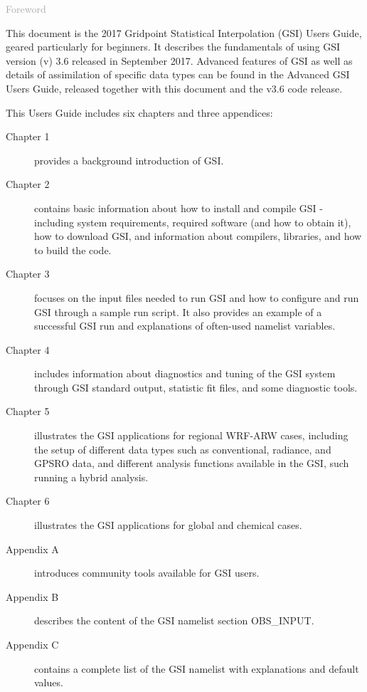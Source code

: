 \begin{titlepage}
\vspace*{0.5cm}
\noindent

\begin{flushleft}
\textcolor{darkgray}{\LARGE Foreword}
\vspace*{1cm}\par

This document is the 2017 Gridpoint Statistical Interpolation (GSI) User\textquotesingle s Guide, geared particularly for beginners. It describes the fundamentals of using GSI version (v) 3.6 released in September 2017. Advanced features of GSI as well as details of assimilation of specific data types can be found in the Advanced GSI User\textquotesingle s Guide, released together with this document and the v3.6 code release.

This User\textquotesingle s Guide includes six chapters and three appendices:
\begin{description}
\item[Chapter 1] provides a background introduction of GSI.
\item[Chapter 2] contains basic information about how to install and compile GSI - including system requirements, required software (and how to obtain it), how to download GSI, and information about compilers, libraries, and how to build the code.
\item[Chapter 3] focuses on the input files needed to run GSI and how to configure and run GSI through a sample run script. It also provides an example of a successful GSI run and explanations of often-used namelist variables.
\item[Chapter 4] includes information about diagnostics and tuning of the GSI system through GSI standard output, statistic fit files, and some diagnostic tools.
\item[Chapter 5] illustrates the GSI applications for regional WRF-ARW cases, including the setup of different data types such as conventional, radiance, and GPSRO data, and different analysis functions available in the GSI, such running a hybrid analysis.
\item[Chapter 6] illustrates the GSI applications for global and chemical cases.
\item[Appendix A] introduces community tools available for GSI users.
\item[Appendix B] describes the content of the GSI namelist section OBS\_INPUT.
\item[Appendix C] contains a complete list of the GSI namelist with explanations and default values.
\end{description}


\end{flushleft}
\end{titlepage}
